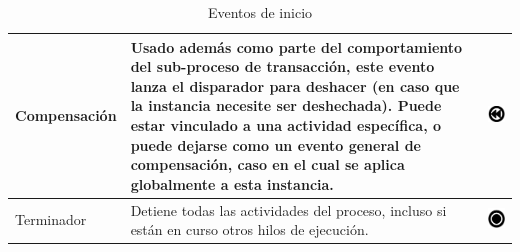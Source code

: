 \begin{table}[H]
\begin{tabular}{ |p{2cm}|p{9.5cm}|p{1.7cm} |  }
		\hline
		{\small Compensación } & {\small Usado además como parte del comportamiento del sub-proceso de transacción, este evento lanza el disparador para deshacer (en caso que la instancia necesite ser deshechada). Puede estar vinculado a una actividad específica, o puede dejarse como un evento general de compensación, caso en el cual se aplica globalmente a esta instancia. } & \vspace{1mm} \hspace{2mm} \includegraphics[scale=0.2]{Capitulo2/imagenes/CompensacionF}\\
		
		\hline
		{\small Terminador } & {\small Detiene todas las actividades del proceso, incluso si están en curso otros hilos de ejecución. } & \vspace{1mm} \hspace{2mm} \includegraphics[scale=0.2]{Capitulo2/imagenes/EventoTer}\\
		\hline
	\end{tabular}    
	\caption{Eventos de inicio \citep{stephena2009}}
	\label{tabla:Eventosdeinicio}
\end{table}

